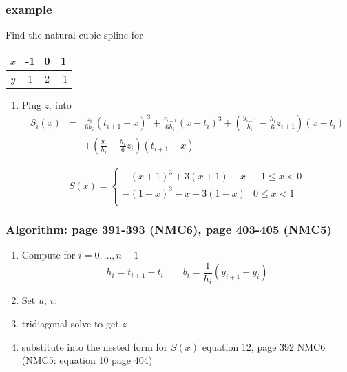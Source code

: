 \documentclass[10pt]{beamer}
\begin{document}
\begin{frame}
\frametitle{example}
Find the natural cubic spline for 
\begin{tabular}{c | c c c }
$x$ & -1 & 0 & 1\\\hline
$y$ & 1 & 2 & -1\\
\end{tabular}
\begin{enumerate}
  \item Plug $z_i$ into
\begin{eqnarray*}
  S_i(x) &=& \frac{z_i}{6h_i}(t_{i+1}-x)^3
+\frac{z_{i+1}}{6h_i}(x-t_i)^3 
+\left(\frac{y_{i+1}}{h_i} - \frac{h_i}{6}z_{i+1}\right)(x-t_i)\\
&&+\left(\frac{y_i}{h_i} - \frac{h_i}{6}z_i\right) (t_{i+1}-x)
\end{eqnarray*}
\bigskip

\begin{equation*}
  S(x) = \begin{cases}
    -(x+1)^3 + 3(x+1)-x& -1\leq x < 0\\ 
    -(1-x)^3 -x +3(1-x)& 0\leq x < 1\\ 
\end{cases}
\end{equation*}
\end{enumerate}
\end{frame}
\begin{frame}
\frametitle{Algorithm: page 391-393 (NMC6), page 403-405 (NMC5)}
\begin{enumerate}
  \item Compute for $i=0,\dots,n-1$
  \begin{equation*}
  h_i=t_{i+1}-t_i\qquad b_i=\frac{1}{h_i}(y_{i+1}-y_{i})
  \end{equation*}
  \item Set $u$, $v$:
  \item tridiagonal solve to get $z$
  \item substitute into the nested form for $S(x)$ equation 12, page 392 NMC6 (NMC5: equation 10 page 404)
\end{enumerate}
\end{frame}
\end{document}
